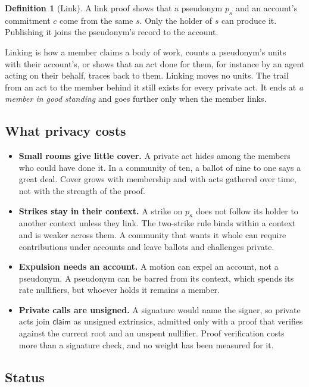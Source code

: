 \documentclass[11pt,a4paper]{article}
\theoremstyle{definition}
\newtheorem{definition}{Definition}[section]
\theoremstyle{plain}
\theoremstyle{remark}
\begin{document}
\begin{definition}[Link]
A link proof shows that a pseudonym $p_\kappa$ and an account's commitment $c$ come from the same $s$. Only the holder of $s$ can produce it. Publishing it joins the pseudonym's record to the account.
\end{definition}

Linking is how a member claims a body of work, counts a pseudonym's units with their account's, or shows that an act done for them, for instance by an agent acting on their behalf, traces back to them. Linking moves no units. The trail from an act to the member behind it still exists for every private act. It ends at \emph{a member in good standing} and goes further only when the member links.

\subsection{What privacy costs}

\begin{itemize}
  \item \textbf{Small rooms give little cover.} A private act hides among the members who could have done it. In a community of ten, a ballot of nine to one says a great deal. Cover grows with membership and with acts gathered over time, not with the strength of the proof.
  \item \textbf{Strikes stay in their context.} A strike on $p_\kappa$ does not follow its holder to another context unless they link. The two-strike rule binds within a context and is weaker across them. A community that wants it whole can require contributions under accounts and leave ballots and challenges private.
  \item \textbf{Expulsion needs an account.} A motion can expel an account, not a pseudonym. A pseudonym can be barred from its context, which spends its rate nullifiers, but whoever holds it remains a member.
  \item \textbf{Private calls are unsigned.} A signature would name the signer, so private acts join $\mathsf{claim}$ as unsigned extrinsics, admitted only with a proof that verifies against the current root and an unspent nullifier. Proof verification costs more than a signature check, and no weight has been measured for it.
\end{itemize}

\subsection{Status}
\end{document}

